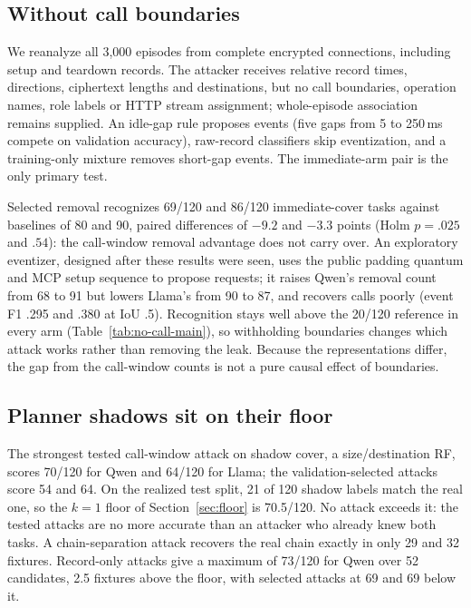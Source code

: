 \subsection{Without call boundaries}\label{sec:noboundary}
We reanalyze all 3,000 episodes from complete encrypted connections, including setup and teardown records. The attacker receives relative record times, directions, ciphertext lengths and destinations, but no call boundaries, operation names, role labels or HTTP stream assignment; whole-episode association remains supplied. An idle-gap rule proposes events (five gaps from 5 to 250\,ms compete on validation accuracy), raw-record classifiers skip eventization, and a training-only mixture removes short-gap events. The immediate-arm pair is the only primary test.


Selected removal recognizes 69/120 and 86/120 immediate-cover tasks against baselines of 80 and 90, paired differences of $-9.2$ and $-3.3$ points (Holm $p=.025$ and $.54$): the call-window removal advantage does not carry over. An exploratory eventizer, designed after these results were seen, uses the public padding quantum and MCP setup sequence to propose requests; it raises Qwen's removal count from 68 to 91 but lowers Llama's from 90 to 87, and recovers calls poorly (event F1 .295 and .380 at IoU .5). Recognition stays well above the 20/120 reference in every arm (Table~\ref{tab:no-call-main}), so withholding boundaries changes which attack works rather than removing the leak. Because the representations differ, the gap from the call-window counts is not a pure causal effect of boundaries.

\subsection{Planner shadows sit on their floor}\label{sec:shadow}
The strongest tested call-window attack on shadow cover, a size/destination RF, scores 70/120 for Qwen and 64/120 for Llama; the validation-selected attacks score 54 and 64. On the realized test split, 21 of 120 shadow labels match the real one, so the $k=1$ floor of Section~\ref{sec:floor} is 70.5/120. No attack exceeds it: the tested attacks are no more accurate than an attacker who already knew both tasks. A chain-separation attack recovers the real chain exactly in only 29 and 32 fixtures. Record-only attacks give a maximum of 73/120 for Qwen over 52 candidates, 2.5 fixtures above the floor, with selected attacks at 69 and 69 below it.

